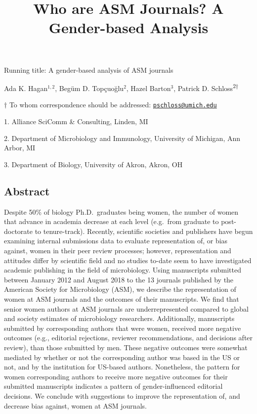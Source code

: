 \documentclass[11pt,]{article}
\title{\textbf{Who are ASM Journals? A Gender-based Analysis}}
\author{}
\date{}
\begin{document}
\maketitle

\vspace{35mm}

Running title: A gender-based analysis of ASM journals

\vspace{35mm}

Ada K. Hagan\(^{1,2}\), Begüm D. Topçuoğlu\({^2}\), Hazel
Barton\({^3}\), Patrick D. Schloss\textsuperscript{2\(\dagger\)}

\vspace{40mm}

\(\dagger\) To whom correspondence should be addressed:
\href{mailto:pschloss@umich.edu}{\nolinkurl{pschloss@umich.edu}}

1. Alliance SciComm \& Consulting, Linden, MI

2. Department of Microbiology and Immunology, University of Michigan,
Ann Arbor, MI

3. Department of Biology, University of Akron, Akron, OH

\newpage

\linenumbers

\subsection{Abstract}\label{abstract}

Despite 50\% of biology Ph.D.~graduates being women, the number of women
that advance in academia decrease at each level (e.g.~from graduate to
post-doctorate to tenure-track). Recently, scientific societies and
publishers have begun examining internal submissions data to evaluate
representation of, or bias against, women in their peer review
processes; however, representation and attitudes differ by scientific
field and no studies to-date seem to have investigated academic
publishing in the field of microbiology. Using manuscripts submitted
between January 2012 and August 2018 to the 13 journals published by the
American Society for Microbiology (ASM), we describe the representation
of women at ASM journals and the outcomes of their manuscripts. We find
that senior women authors at ASM journals are underrepresented compared
to global and society estimates of microbiology researchers.
Additionally, manuscripts submitted by corresponding authors that were
women, received more negative outcomes (e.g., editorial rejections,
reviewer recommendations, and decisions after review), than those
submitted by men. These negative outcomes were somewhat mediated by
whether or not the corresponding author was based in the US or not, and
by the institution for US-based authors. Nonetheless, the pattern for
women corresponding authors to receive more negative outcomes for their
submitted manuscripts indicates a pattern of gender-influenced editorial
decisions. We conclude with suggestions to improve the representation
of, and decrease bias against, women at ASM journals.
\end{document}
